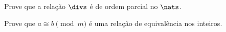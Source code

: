 \begin{exercise}
	Prove que a relação $\divs$ é de ordem parcial no $\nats$.
\end{exercise}

\begin{exercise}
	Prove que $a\cong b\pmod m$ é uma relação de equivalência nos inteiros.
\end{exercise}
